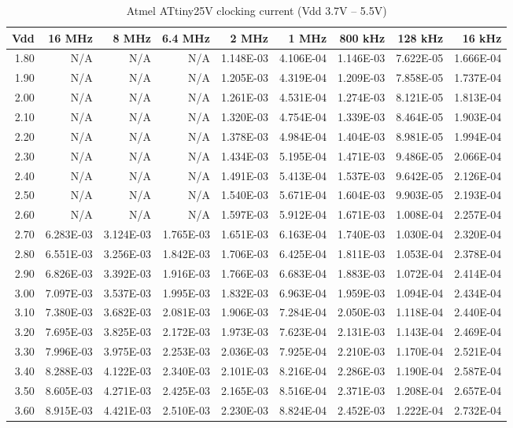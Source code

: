 \begin{table}
\begin{centering}
\begin{tabular}{|r|r|r|r|r|r|r|r|r|}
\hline
Vdd  & 16 MHz  & 8 MHz  & 6.4 MHz  & 2 MHz  & 1 MHz  & 800 kHz  & 128 kHz  & 16 kHz \tabularnewline
\hline
1.80  & N/A  & N/A  & N/A  & 1.148E-03  & 4.106E-04  & 1.146E-03  & 7.622E-05  & 1.666E-04 \tabularnewline
1.90  & N/A  & N/A  & N/A  & 1.205E-03  & 4.319E-04  & 1.209E-03  & 7.858E-05  & 1.737E-04 \tabularnewline
2.00  & N/A  & N/A  & N/A  & 1.261E-03  & 4.531E-04  & 1.274E-03  & 8.121E-05  & 1.813E-04 \tabularnewline
2.10  & N/A  & N/A  & N/A  & 1.320E-03  & 4.754E-04  & 1.339E-03  & 8.464E-05  & 1.903E-04 \tabularnewline
2.20  & N/A  & N/A  & N/A  & 1.378E-03  & 4.984E-04  & 1.404E-03  & 8.981E-05  & 1.994E-04 \tabularnewline
2.30  & N/A  & N/A  & N/A  & 1.434E-03  & 5.195E-04  & 1.471E-03  & 9.486E-05  & 2.066E-04 \tabularnewline
2.40  & N/A  & N/A  & N/A  & 1.491E-03  & 5.413E-04  & 1.537E-03  & 9.642E-05  & 2.126E-04 \tabularnewline
2.50  & N/A  & N/A  & N/A  & 1.540E-03  & 5.671E-04  & 1.604E-03  & 9.903E-05  & 2.193E-04 \tabularnewline
2.60  & N/A  & N/A  & N/A  & 1.597E-03  & 5.912E-04  & 1.671E-03  & 1.008E-04  & 2.257E-04 \tabularnewline
2.70  & 6.283E-03  & 3.124E-03  & 1.765E-03  & 1.651E-03  & 6.163E-04  & 1.740E-03  & 1.030E-04  & 2.320E-04 \tabularnewline
2.80  & 6.551E-03  & 3.256E-03  & 1.842E-03  & 1.706E-03  & 6.425E-04  & 1.811E-03  & 1.053E-04  & 2.378E-04 \tabularnewline
2.90  & 6.826E-03  & 3.392E-03  & 1.916E-03  & 1.766E-03  & 6.683E-04  & 1.883E-03  & 1.072E-04  & 2.414E-04 \tabularnewline
3.00  & 7.097E-03  & 3.537E-03  & 1.995E-03  & 1.832E-03  & 6.963E-04  & 1.959E-03  & 1.094E-04  & 2.434E-04 \tabularnewline
3.10  & 7.380E-03  & 3.682E-03  & 2.081E-03  & 1.906E-03  & 7.284E-04  & 2.050E-03  & 1.118E-04  & 2.440E-04 \tabularnewline
3.20  & 7.695E-03  & 3.825E-03  & 2.172E-03  & 1.973E-03  & 7.623E-04  & 2.131E-03  & 1.143E-04  & 2.469E-04 \tabularnewline
3.30  & 7.996E-03  & 3.975E-03  & 2.253E-03  & 2.036E-03  & 7.925E-04  & 2.210E-03  & 1.170E-04  & 2.521E-04 \tabularnewline
3.40  & 8.288E-03  & 4.122E-03  & 2.340E-03  & 2.101E-03  & 8.216E-04  & 2.286E-03  & 1.190E-04  & 2.587E-04 \tabularnewline
3.50  & 8.605E-03  & 4.271E-03  & 2.425E-03  & 2.165E-03  & 8.516E-04  & 2.371E-03  & 1.208E-04  & 2.657E-04 \tabularnewline
3.60  & 8.915E-03  & 4.421E-03  & 2.510E-03  & 2.230E-03  & 8.824E-04  & 2.452E-03  & 1.222E-04  & 2.732E-04 \tabularnewline
\hline
\end{tabular}
\par\end{centering}

\protect\caption{Atmel ATtiny25V clocking current (Vdd 3.7V -- 5.5V)}


\end{table}
